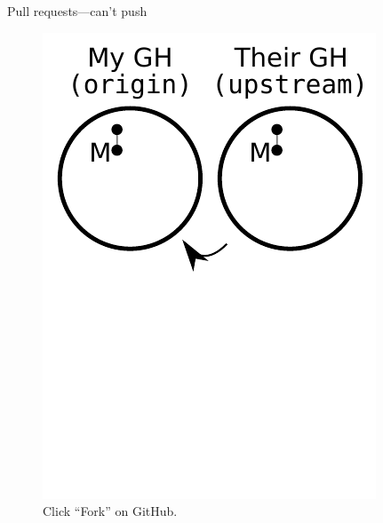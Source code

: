 \begin{frame}{Pull requests---can't push}
  \begin{figure}
    \includegraphics{fork_002.pdf}
    \\ Click ``Fork'' on GitHub.
    \\ \texttt{}
  \end{figure}
\end{frame}

